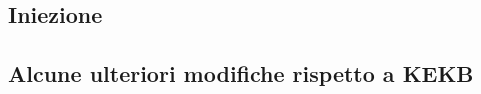\documentclass[10pt,a4paper,twoside]{report}
\begin{document}
\begin{comment}
In figura \ref{fig:beampar} si riportano i parametri di macchina (default) dell'acceleratore SuperKEKB.

\begin{equation}
\texttt{[image: beam\_par]}
\caption{Parametri di macchina di SuperKEKB. Il simbolo ''*'' indica i valori nel PI.}
\label{fig:beampar}
\end{equation}


\end{comment}


\begin{comment}
\subsection{Cromaticità e correzioni ottiche}
\end{comment}

\subsection{Iniezione}

\subsection{Alcune ulteriori modifiche rispetto a KEKB}

\begin{comment}

L'upgrade da KEKB a SuperKEKB, come in parte visto, ha richiesto importanti cambiamenti nei fasci e nello schema di collisione, tutto volto a raggiungere nuove vette di luimnosità. Altre fondamentali modifiche sono state fatte lungo l'anello di collisione, tra cui:

\begin{item}
\item rifacimento della regione d'interazione, che comprende 4 m intorno al PI, in modo da poter ospitare il nuovo detector Belle II, il sistema di focusing finale dei fasci e le due beam pipes;
\item il sistema a radiofrequenza è stato modificato per permettere una corrente maggiore dei fasci;
\item l'aggiunta di alcuni collimatori lungo entrambi gli anelli (11 nel LER  e 20 nel HER) per poter limitare il danno da radiazione sul rivelatore e i ''quenches'' dei magneti superconduttori, cioè un surriscaldamento dei suoi avvolgimenti che genericamente causa la perdità della superconduttività, dissipando la corrente circolante.
\item anche il sistema di vuoto è stato migliorato per limitare alcuni effetti collegati alla perdita di potenza del fascio, allungando quindi la vita media del fascio stesso.
\end{item}

\end{comment}
\end{document}
